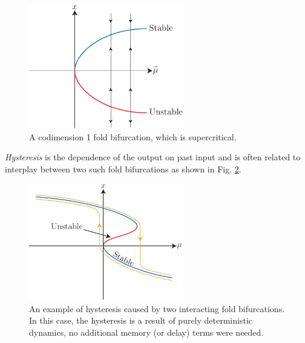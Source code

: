 \begin{enumerate}
		\begin{figure}[h!]
			\centering
			\includegraphics[width=0.6\textwidth]{figures/ch3/13codim1_bif.pdf}
			\caption{A codimension 1 fold bifurcation, which is supercritical.}
			\label{fig:codim1_bif}
		\end{figure}
		\begin{remark}[]
			\emph{Hysteresis} is the dependence of the output on past input and is often related to interplay between two such fold bifurcations as shown in Fig. \ref{fig:hysteresis}.
		\begin{figure}[h!]
			\centering
			\includegraphics[width=0.6\textwidth]{figures/ch3/14hysteresis.pdf}
			\caption{An example of hysteresis caused by two interacting fold bifurcations. In this case, the hysteresis is a result of purely deterministic dynamics, no additional memory (or delay) terms were needed.}
			\label{fig:hysteresis}
		\end{figure}
		
		\end{remark}
		

\end{enumerate}
